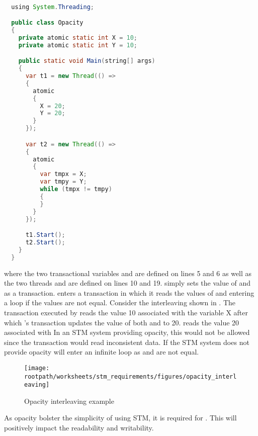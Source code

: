 \begin{lstlisting}[label=lst:stm_opacity,
 caption={Opacity example},
 language=Java, 
 showspaces=false,
 showtabs=false,
 breaklines=true,
 showstringspaces=false,
 breakatwhitespace=true,
 commentstyle=\color{greencomments},
 keywordstyle=\color{bluekeywords},
 stringstyle=\color{redstrings},
 morekeywords={atomic, retry, orelse, var, get, set, using}]  % Start your code-block

  using System.Threading;

  public class Opacity
  {
    private atomic static int X = 10;
    private atomic static int Y = 10;

    public static void Main(string[] args)
    {
      var t1 = new Thread(() =>
      {
        atomic
        {
          X = 20;
          Y = 20;
        }
      });

      var t2 = new Thread(() =>
      {
        atomic
        {
          var tmpx = X;
          var tmpy = Y;
          while (tmpx != tmpy)
          {
          }
        }
      });

      t1.Start();
      t2.Start();
    }
  }
\end{lstlisting}
where the two transactional variables  and  are defined on lines 5 and 6 as well as the two threads  and  are defined on lines 10 and 19.  simply sets the value of  and  as a transaction.  enters a transaction in which it reads the values of  and  entering a loop if the values are not equal. Consider the interleaving shown in . The transaction executed by  reads the value 10 associated with the variable X after which 's transaction updates the value of both   and  to 20.  reads the value 20 associated with  In an \ac{STM} system providing opacity, this would not be allowed since the transaction would read inconsistent data. If the \ac{STM} system does not provide opacity  will enter an infinite loop as  and  are not equal.

\begin{figure}[htbp]
\centering
\texttt{[image: \\rootpath/worksheets/stm\_requirements/figures/opacity\_interleaving]}
\caption{Opacity interleaving example}
\label{fig:opacity_interleaving}
\end{figure}

As opacity bolster the simplicity of using \ac{STM}, it is required for \stmname. This will positively impact the readability and writability.


